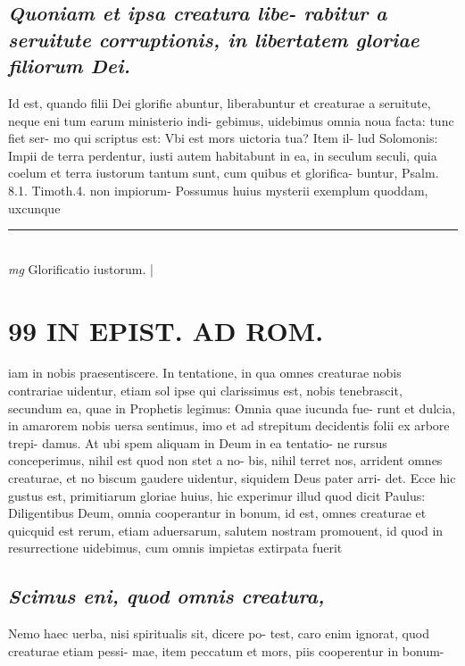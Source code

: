 \documentclass{article}
\begin{document}
\begin{pages}
\subsection*{\textit{Quoniam et ipsa creatura libe- rabitur a seruitute corruptionis, in libertatem gloriae filiorum Dei. }}\pstart Id est, quando filii Dei glorifie abuntur, liberabuntur et creaturae a seruitute, neque eni tum earum ministerio indi- gebimus, uidebimus omnia noua facta: tunc fiet ser- mo qui scriptus est: Vbi est mors uictoria tua? Item il- lud Solomonis: Impii de terra perdentur, iusti autem habitabunt in ea, in seculum seculi, quia coelum et terra iustorum tantum sunt, cum quibus et glorifica- buntur, Psalm. 8.1. Timoth.4. non impiorum- Possumus huius mysterii exemplum quoddam, uxcunque   \pend
\vspace{0.5cm}\noindent
\vspace{0.2cm}\rule{1cm}{0.2pt}\\ 
\hspace{0.2cm}\textit{mg}
\footnotesize Glorificatio iustorum.  
\normalsize| 
\section*{99 IN EPIST. AD ROM.  }
\marginpar{[ p.]}\pstart iam in nobis praesentiscere. In tentatione, in qua omnes creaturae nobis contrariae uidentur, etiam sol ipse qui clarissimus est, nobis tenebrascit, secundum ea, quae in Prophetis legimus: Omnia quae iucunda fue- runt et dulcia, in amarorem nobis uersa sentimus, imo et ad strepitum decidentis folii ex arbore trepi- damus. At ubi spem aliquam in Deum in ea tentatio- ne rursus conceperimus, nihil est quod non stet a no- bis, nihil terret nos, arrident omnes creaturae, et no biscum gaudere uidentur, siquidem Deus pater arri- det. Ecce hic gustus est, primitiarum gloriae huius, hic experimur illud quod dicit Paulus: Diligentibus Deum, omnia cooperantur in bonum, id est, omnes creaturae et quicquid est rerum, etiam aduersarum, salutem nostram promouent, id quod in resurrectione uidebimus, cum omnis impietas extirpata fuerit  \pend
{}
{}
\subsection*{\textit{Scimus eni, quod omnis creatura, }}\pstart Nemo haec uerba, nisi spiritualis sit, dicere po- test, caro enim ignorat, quod creaturae etiam pessi- mae, item peccatum et mors, piis cooperentur in bonum-  \pend
{}
{}

\end{pages}
\end{document}
